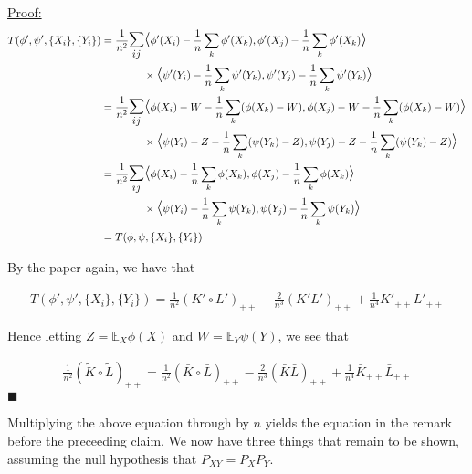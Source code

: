 \documentclass{article}
\newenvironment{claimproof}[1]{\par\noindent\underline{Proof:}\space#1}{\hfill $\blacksquare$}
\begin{document}
\begin{claimproof}
\begin{align*}
T(\phi', \psi', \{X_i\},\{Y_i\}) & = \frac{1}{n^2} \mathlarger{\mathlarger{\sum_{ij}}} \mathlarger{\mathlarger{\langle}} \phi'(X_i) - \frac{1}{n}\sum_k \phi'(X_k), \phi'(X_j) - \frac{1}{n}\sum_k \phi'(X_k) \mathlarger{\mathlarger{\rangle}} \\ & \quad\quad\quad\quad \times \mathlarger{\mathlarger{\langle}} \psi'(Y_i) - \frac{1}{n}\sum_k \psi'(Y_k), \psi'(Y_j) - \frac{1}{n}\sum_k \psi'(Y_k) \mathlarger{\mathlarger{\rangle}} \\ &
= \frac{1}{n^2} \mathlarger{\mathlarger{\sum_{ij}}} \mathlarger{\mathlarger{\langle}} \phi(X_i) - W - \frac{1}{n}\sum_k (\phi(X_k)-W), \phi(X_j)-W - \frac{1}{n}\sum_k (\phi(X_k)-W) \mathlarger{\mathlarger{\rangle}} \\ & \quad\quad\quad\quad \times \mathlarger{\mathlarger{\langle}} \psi(Y_i) - Z - \frac{1}{n}\sum_k (\psi(Y_k) - Z), \psi(Y_j) - Z - \frac{1}{n}\sum_k (\psi(Y_k) - Z) \mathlarger{\mathlarger{\rangle}}\\&
= \frac{1}{n^2} \mathlarger{\mathlarger{\sum_{ij}}} \mathlarger{\mathlarger{\langle}} \phi(X_i) - \frac{1}{n}\sum_k \phi(X_k), \phi(X_j) - \frac{1}{n}\sum_k \phi(X_k) \mathlarger{\mathlarger{\rangle}} \\ & \quad\quad\quad\quad \times \mathlarger{\mathlarger{\langle}} \psi(Y_i) - \frac{1}{n}\sum_k \psi(Y_k), \psi(Y_j) - \frac{1}{n}\sum_k \psi(Y_k) \mathlarger{\mathlarger{\rangle}} \\ &
= T(\phi, \psi, \{X_i\},\{Y_i\})
\end{align*}

By the paper again, we have that

\begin{align*}
T(\phi', \psi', \{X_i\},\{Y_i\}) = \frac{1}{n^2}(K'\circ L')_{++} - \frac{2}{n^3}(K'L')_{++} + \frac{1}{n^4}K'_{++}L'_{++}
\end{align*}

Hence letting $Z = \mathbb{E}_X \phi(X)$ and $W = \mathbb{E}_Y \psi(Y)$, we see that

\begin{align*}
\frac{1}{n^2} (\tilde{K}\circ \tilde{L})_{++} = \frac{1}{n^2}(\bar{K}\circ \bar{L})_{++} - \frac{2}{n^3}(\bar{K}\bar{L})_{++} + \frac{1}{n^4}\bar{K}_{++}\bar{L}_{++}
\end{align*}
\end{claimproof}

Multiplying the above equation through by $n$ yields the equation in the remark before the preceeding claim. We now have three things that remain to be shown, assuming the null hypothesis that $P_{XY}=P_XP_Y$.
\end{document}
